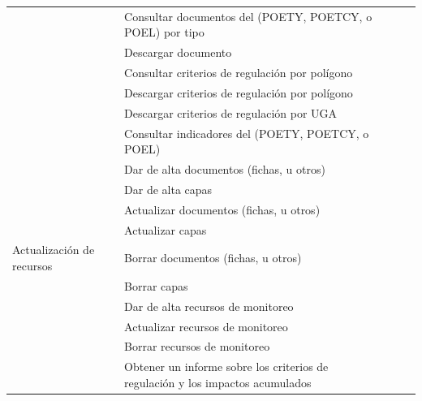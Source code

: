 \begin{longtable}{p{4cm} p{7cm} p{.5cm} p{.5cm} p{.5cm}}
 & Consultar documentos del (POETY, POETCY, o POEL) por tipo &\cellcolor{myotroazul} &\cellcolor{myotroazul} &\cellcolor{myotroazul} \\

 & Descargar documento &\cellcolor{myotroazul} &\cellcolor{myotroazul} &\cellcolor{myotroazul} \\

 & Consultar criterios de regulación por polígono &\cellcolor{myotroazul} &\cellcolor{myotroazul} &\cellcolor{myotroazul} \\

 & Descargar criterios de regulación por polígono &\cellcolor{myotroazul} &\cellcolor{myotroazul} &\cellcolor{myotroazul} \\

 & Descargar criterios de regulación por UGA & \cellcolor{myotroazul}&\cellcolor{myotroazul} &\cellcolor{myotroazul} \\

 & Consultar indicadores del (POETY, POETCY, o POEL) &\cellcolor{myotroazul} &\cellcolor{myotroazul} & \cellcolor{myotroazul}  \\
\hline

 & Dar de alta documentos (fichas, u otros) &\cellcolor{myotroazul}  & &\cellcolor{myotroazul} \\

 & Dar de alta capas & \cellcolor{myotroazul} & &\cellcolor{myotroazul} \\

 & Actualizar documentos (fichas, u otros) &\cellcolor{myotroazul}  & &\cellcolor{myotroazul} \\

& Actualizar capas &\cellcolor{myotroazul} & & \cellcolor{myotroazul}\\

Actualización de recursos & Borrar documentos (fichas, u otros) &\cellcolor{myotroazul} & &\cellcolor{myotroazul} \\

 & Borrar capas &\cellcolor{myotroazul} & & \cellcolor{myotroazul}\\

 & Dar de alta recursos de monitoreo &\cellcolor{myotroazul} & &\cellcolor{myotroazul} \\

 & Actualizar recursos de monitoreo &\cellcolor{myotroazul} & & \cellcolor{myotroazul}\\

 & Borrar recursos de monitoreo &\cellcolor{myotroazul} & & \cellcolor{myotroazul}\\
\hline
 &
Obtener un informe sobre los criterios de regulación y los impactos acumulados & \cellcolor{myotroazul}& & \cellcolor{myotroazul}\\


\end{longtable}
